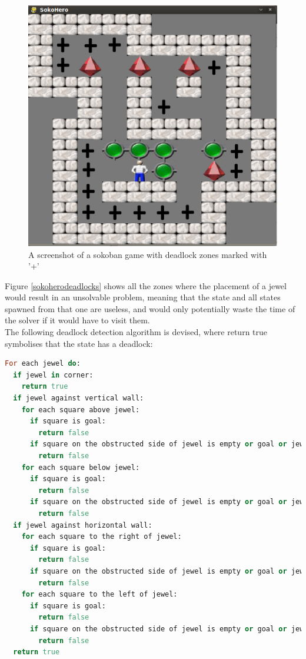 \begin{figure}[ht]
\centering
\includegraphics[scale=0.25]{images/sokohero_deadlocks.eps}
\caption{A screenshot of a sokoban game with deadlock zones marked with '+'}
\label{fig:sokoherodeadlocks}
\end{figure}

Figure \ref{sokoherodeadlocks} shows all the zones where the placement of a jewel would result in an unsolvable problem, meaning that the state and all states spawned from that one are useless, and would only potentially waste the time of the solver if it would have to visit them.
\\
The following deadlock detection algorithm is devised, where return true symbolises that the state has a deadlock:

\begin{lstlisting}[language=Ruby, frame=single, basicstyle=\small, caption={Deadlock detection pseudo code}, label={code:deaddetect}]
For each jewel do:
  if jewel in corner:
    return true
  if jewel against vertical wall:
    for each square above jewel:
      if square is goal:
        return false
      if square on the obstructed side of jewel is empty or goal or jewel:
        return false
    for each square below jewel:
      if square is goal:
        return false
      if square on the obstructed side of jewel is empty or goal or jewel:
        return false
  if jewel against horizontal wall:
    for each square to the right of jewel:
      if square is goal:
        return false
      if square on the obstructed side of jewel is empty or goal or jewel:
        return false
    for each square to the left of jewel:
      if square is goal:
        return false
      if square on the obstructed side of jewel is empty or goal or jewel:
        return false
  return true
\end{lstlisting}

